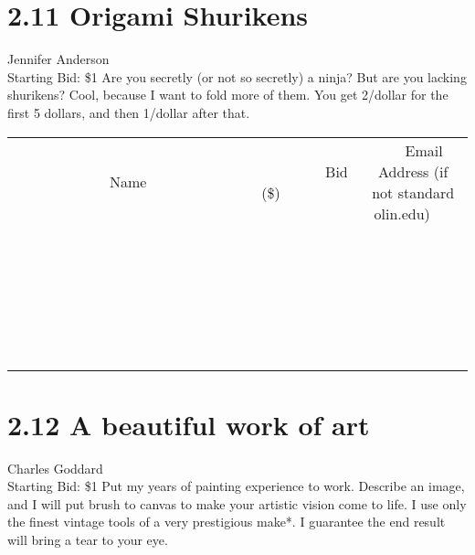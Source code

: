 \documentclass[11pt]{article}
\begin{document}
\section*{2.11 Origami Shurikens}
Jennifer Anderson
\\
Starting Bid: \$1
\newline
Are you secretly (or not so secretly) a ninja? But are you lacking shurikens? Cool, because I want to fold more of them.
You get 2/dollar for the first 5 dollars, and then 1/dollar after that.
\\[6ex]
\begin{tabular}{c c c}
~~~~~~~~~~~~~Name~~~~~~~~~~~~~ & ~~~~~~~~~Bid (\$)~~~~~~~~~  & ~~~Email Address (if not standard olin.edu)~~~\\
 & & \\
\hline
 & & \\
\hline
 & & \\
\hline
 & & \\
\hline
 & & \\
\hline
 & & \\
\hline
 & & \\
\hline
 & & \\
\hline
 & & \\
\hline
 & & \\
\hline
 & & \\
\hline
 & & \\
\hline
 & & \\
\hline
 & & \\
\hline
 & & \\
\hline
 & & \\
\hline
 & & \\
\hline
 & & \\
\hline
 & & \\
\hline
 & & \\
\hline
 & & \\
\hline
 & & \\
\hline
 & & \\
\hline
 & & \\
\hline
 & & \\
\hline
 & & \\
\hline
\end{tabular}
\newpage
\section*{2.12 A beautiful work of art}
Charles Goddard
\\
Starting Bid: \$1
\newline
Put my years of painting experience to work. Describe an image, and I will put brush to canvas to make your artistic vision come to life. I use only the finest vintage tools of a very prestigious make*. I guarantee the end result will bring a tear to your eye.
\end{document}
